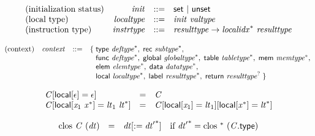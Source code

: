 $$
\begin{array}{@{}lrrl@{}l@{}}
\mbox{(initialization status)} & {\mathit{init}} &::=& \mathsf{set} ~|~ \mathsf{unset} \\
\mbox{(local type)} & {\mathit{localtype}} &::=& {\mathit{init}}~{\mathit{valtype}} \\
\mbox{(instruction type)} & {\mathit{instrtype}} &::=& {\mathit{resulttype}} \rightarrow {{\mathit{localidx}}^\ast}~{\mathit{resulttype}} \\
\end{array}
$$

\vspace{1ex}

$$
\begin{array}{@{}lrrl@{}l@{}}
\mbox{(context)} & {\mathit{context}} &::=& \{\; \begin{array}[t]{@{}l@{}l@{}}
\mathsf{type}~{{\mathit{deftype}}^\ast},\; \mathsf{rec}~{{\mathit{subtype}}^\ast},\; \\
  \mathsf{func}~{{\mathit{deftype}}^\ast},\; \mathsf{global}~{{\mathit{globaltype}}^\ast},\; \mathsf{table}~{{\mathit{tabletype}}^\ast},\; \mathsf{mem}~{{\mathit{memtype}}^\ast},\; \\
  \mathsf{elem}~{{\mathit{elemtype}}^\ast},\; \mathsf{data}~{{\mathit{datatype}}^\ast},\; \\
  \mathsf{local}~{{\mathit{localtype}}^\ast},\; \mathsf{label}~{{\mathit{resulttype}}^\ast},\; \mathsf{return}~{{\mathit{resulttype}}^?} \;\}\end{array} \\
\end{array}
$$

\vspace{1ex}

$$
\begin{array}{@{}lcl@{}l@{}}
{\mathit{C}}{}[\mathsf{local}{}[\epsilon] = \epsilon] &=& {\mathit{C}} &  \\
{\mathit{C}}{}[\mathsf{local}{}[{\mathit{x}}_{{1}}~{{\mathit{x}}^\ast}] = {\mathit{lt}}_{{1}}~{{\mathit{lt}}^\ast}] &=& {\mathit{C}}{}[\mathsf{local}{}[{\mathit{x}}_{{1}}] = {\mathit{lt}}_{{1}}]{}[\mathsf{local}{}[{{\mathit{x}}^\ast}] = {{\mathit{lt}}^\ast}] &  \\
\end{array}
$$

\vspace{1ex}

$$
\begin{array}{@{}lcl@{}l@{}}
{\mathrm{clos}}~{\mathit{C}}~({\mathit{dt}}) &=& {{\mathit{dt}}}{{}[{ := }\;{{\mathit{dt}'}^\ast}]} &\quad
  \mbox{if}~{{\mathit{dt}'}^\ast} = {\mathrm{clos}}~{}^\ast~({\mathit{C}}.\mathsf{type}) \\
\end{array}
$$

